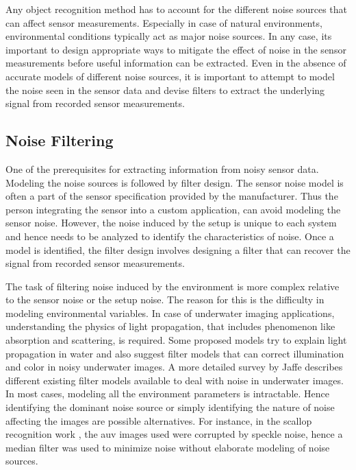 Any object recognition method has to account for the different noise sources that can affect sensor measurements. Especially in case of natural environments, environmental conditions typically act as major noise sources. 
In any case, its important to design appropriate ways to mitigate the effect of noise 
in the sensor measurements before useful information can be extracted. 
Even in the absence of accurate models of different noise sources, it is important to attempt to model the noise seen in the sensor data
and devise filters to extract the underlying signal from recorded sensor measurements.

\subsection{Noise Filtering}
\label{sec:noise_filters}

One of the prerequisites for extracting information from noisy sensor data. 
Modeling the noise sources is followed by filter design.
The sensor noise model is often a part of the sensor specification provided by the manufacturer. 
Thus the person integrating the sensor into a custom application, can avoid modeling the sensor noise. 
However, the noise induced by the setup is unique to each system and hence needs to be analyzed to identify the characteristics of noise.
Once a model is identified, the filter design involves designing a filter that can recover the signal from recorded sensor measurements.

The task of filtering noise induced by the environment is more complex relative to 
the sensor noise or the setup noise.
The reason for this is the difficulty in modeling environmental variables. 
In case of underwater imaging applications, understanding the physics of 
light propagation, that includes phenomenon like absorption and scattering, is required. Some proposed models \cite{garcia, ahlen} try to 
explain light propagation in water and also suggest filter models that can correct illumination and color in noisy underwater images. A more detailed survey
by Jaffe \cite{jaffe} describes different existing filter models available to deal with noise in underwater images.
In most cases, modeling all the environment parameters is intractable. Hence identifying the dominant noise source or simply identifying the nature of noise affecting the images are possible alternatives.
For instance, in the scallop recognition work \cite{prasanna_aslo}, the \gls{auv} images used were corrupted by speckle noise, hence a median filter \cite{despeckle} was used to minimize noise without elaborate modeling of noise sources.

